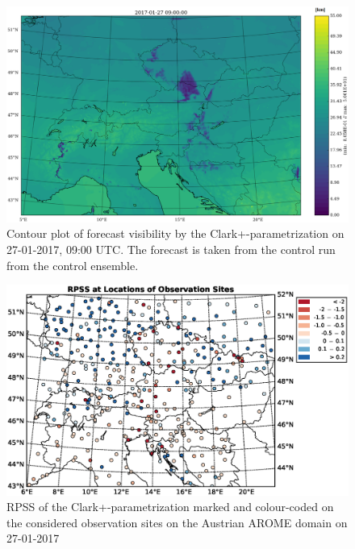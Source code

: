 \begin{figure}[h]
    \centering
    \includegraphics[width=\textwidth]{graphics/visibviri.eps}
    \caption[Contour Plot of Forecast Visibility]{Contour plot of forecast visibility by the Clark+-parametrization on 27-01-2017, 09:00 UTC. The forecast is taken from the control run from the control ensemble. }
    \label{fig:cont_vis}
\end{figure}

\begin{figure}[h]
    \centering
    \includegraphics[width=\textwidth]{graphics/results/Rated_stations20170127.eps}
    \caption[Stations Marked with RPSS 27-01-2017]{RPSS of the Clark+-parametrization marked and colour-coded on the considered observation sites on the Austrian AROME  domain on 27-01-2017}
    \label{fig:Rated_stations_20170127}
\end{figure}


